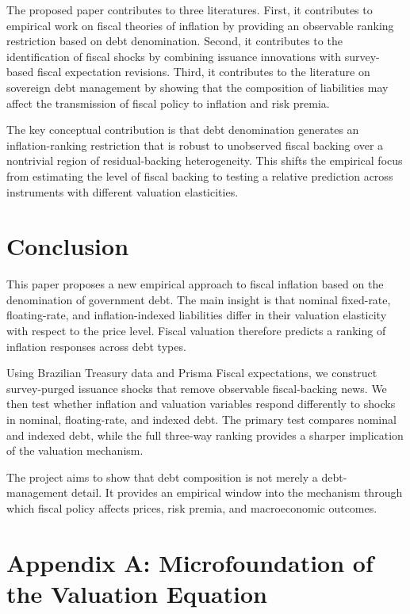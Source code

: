 \documentclass[12pt,a4paper]{article}
\begin{document}
The proposed paper contributes to three literatures. First, it contributes to empirical work on fiscal theories of inflation by providing an observable ranking restriction based on debt denomination. Second, it contributes to the identification of fiscal shocks by combining issuance innovations with survey-based fiscal expectation revisions. Third, it contributes to the literature on sovereign debt management by showing that the composition of liabilities may affect the transmission of fiscal policy to inflation and risk premia.

The key conceptual contribution is that debt denomination generates an inflation-ranking restriction that is robust to unobserved fiscal backing over a nontrivial region of residual-backing heterogeneity. This shifts the empirical focus from estimating the level of fiscal backing to testing a relative prediction across instruments with different valuation elasticities.

\section{Conclusion}
\label{sec:conclusion}

This paper proposes a new empirical approach to fiscal inflation based on the denomination of government debt. The main insight is that nominal fixed-rate, floating-rate, and inflation-indexed liabilities differ in their valuation elasticity with respect to the price level. Fiscal valuation therefore predicts a ranking of inflation responses across debt types.

Using Brazilian Treasury data and Prisma Fiscal expectations, we construct survey-purged issuance shocks that remove observable fiscal-backing news. We then test whether inflation and valuation variables respond differently to shocks in nominal, floating-rate, and indexed debt. The primary test compares nominal and indexed debt, while the full three-way ranking provides a sharper implication of the valuation mechanism.

The project aims to show that debt composition is not merely a debt-management detail. It provides an empirical window into the mechanism through which fiscal policy affects prices, risk premia, and macroeconomic outcomes.

\appendix

\section{Appendix A: Microfoundation of the Valuation Equation}
\end{document}
